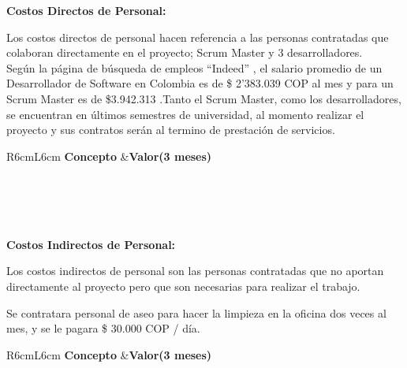 \documentclass[a4paper,12 pt]{article}
\begin{document}
\textbf{Costos Directos de Personal:}

Los costos directos de personal hacen referencia a las personas contratadas que
colaboran directamente en el proyecto; Scrum Master y 3 desarrolladores.\\

Según la página de búsqueda de empleos “Indeed” \cite{01}, el salario promedio de un
Desarrollador de Software en Colombia es de \$ 2’383.039 COP al mes y para un Scrum
Master es de \$3.942.313 .Tanto el Scrum Master, como los desarrolladores, se encuentran
en últimos semestres de universidad, al momento realizar el proyecto y sus contratos
serán al termino de prestación de servicios. 

\begin{table}[H]
    \centering
    \small{
    \begin{tabular}{R{6cm}L{6cm}}
        \textbf{Concepto}   &\textbf{Valor(3 meses)}\\
        \\
         \\
         \\
        \hline
         \\
    \end{tabular}
    \label{T04}}
\end{table}{}


\textbf{Costos Indirectos de Personal:}


Los costos indirectos de personal son las personas contratadas que no aportan directamente al proyecto pero que son necesarias para realizar el trabajo.

Se contratara personal de aseo para hacer la limpieza en la oficina dos veces al mes, y se le pagara \$ 30.000 COP / día.

\begin{table}[H]
    \centering
    \small{
    \begin{tabular}{R{6cm}L{6cm}}
        \textbf{Concepto}   &\textbf{Valor(3 meses)}\\
        \\
         \\
        \hline
         \\
    \end{tabular}
    \label{T201}}
\end{table}{}
\end{document}
